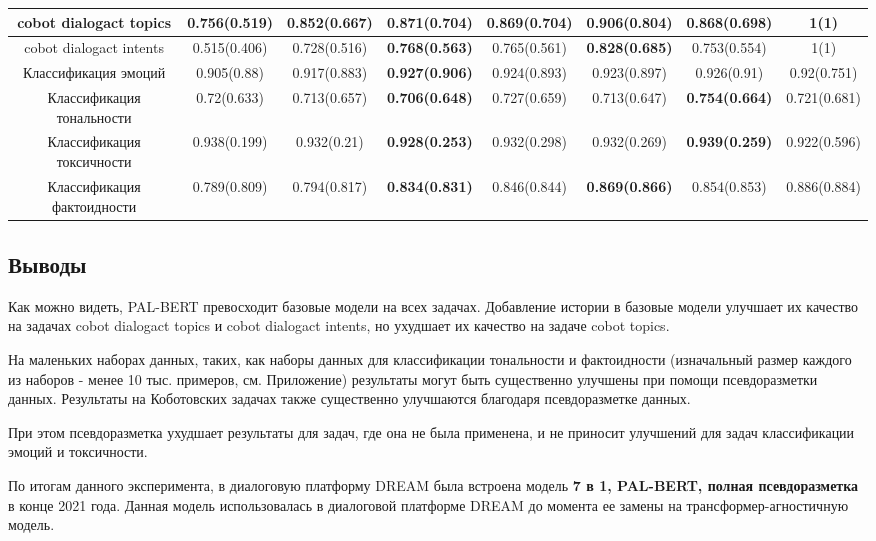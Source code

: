 \begin{table}[htbp]
{\begin{tabular}{|c||c|c|c|c|c|c|c|}
\hline
cobot dialogact topics & 0.756(0.519) & 0.852(0.667) & \textbf{0.871(0.704)} & 0.869(0.704) & \textbf{0.906(0.804)} & 0.868(0.698) & 1(1) \\
\hline
cobot dialogact intents & 0.515(0.406) & 0.728(0.516) & \textbf{0.768(0.563)} & 0.765(0.561) & \textbf{0.828(0.685)} & 0.753(0.554) & 1(1) \\
\hline
Классификация эмоций & 0.905(0.88) & 0.917(0.883) & \textbf{0.927(0.906)} & 0.924(0.893) & 0.923(0.897) & 0.926(0.91) & 0.92(0.751) \\
\hline
Классификация тональности & 0.72(0.633) & 0.713(0.657) & \textbf{0.706(0.648)} & 0.727(0.659) & 0.713(0.647) & \textbf{0.754(0.664)} & 0.721(0.681) \\
\hline
Классификация токсичности & 0.938(0.199) & 0.932(0.21) & \textbf{0.928(0.253)} & 0.932(0.298) & 0.932(0.269) & \textbf{0.939(0.259)} & 0.922(0.596) \\
\hline
Классификация фактоидности & 0.789(0.809) & 0.794(0.817) & \textbf{0.834(0.831)} & 0.846(0.844) & \textbf{0.869(0.866)} & 0.854(0.853) & 0.886(0.884) \\
\hline
\end{tabular}
}
\end{table}

\subsection{Выводы}
Как можно видеть, PAL-BERT превосходит базовые модели на всех задачах. Добавление истории в базовые модели улучшает их качество на задачах cobot dialogact topics и cobot dialogact intents, но ухудшает их качество на задаче cobot topics.

На маленьких наборах данных, таких, как наборы данных для классификации тональности и фактоидности (изначальный размер каждого из наборов - менее 10 тыс. примеров, см. Приложение) результаты могут быть существенно улучшены при помощи псевдоразметки данных. Результаты на Коботовских задачах также существенно улучшаются благодаря псевдоразметке данных.

При этом псевдоразметка ухудшает результаты для задач, где она не была применена, и не приносит улучшений для задач классификации эмоций и токсичности.

По итогам данного эксперимента, в диалоговую платформу {DREAM} была встроена модель \textbf{7 в 1, PAL-BERT, полная псевдоразметка} в конце 2021 года. Данная модель использовалась в диалоговой платформе {DREAM} до момента ее замены на трансформер-агностичную модель.

